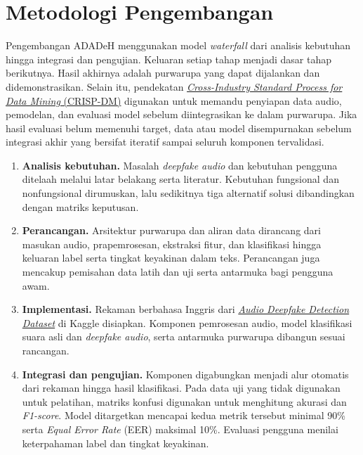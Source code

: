 \section{Metodologi Pengembangan}
Pengembangan ADADeH menggunakan model \textit{waterfall} dari analisis kebutuhan hingga integrasi dan pengujian. Keluaran setiap tahap menjadi dasar tahap berikutnya. Hasil akhirnya adalah purwarupa yang dapat dijalankan dan didemonstrasikan. Selain itu, pendekatan \href{https://public.dhe.ibm.com/software/analytics/spss/documentation/modeler/14.2/es/CRISP-DM.pdf}{\textit{Cross-Industry Standard Process for Data Mining} (CRISP-DM)} digunakan untuk memandu penyiapan data audio, pemodelan, dan evaluasi model sebelum diintegrasikan ke dalam purwarupa. Jika hasil evaluasi belum memenuhi target, data atau model disempurnakan sebelum integrasi akhir yang bersifat iteratif sampai seluruh komponen tervalidasi.

\begin{enumerate}
\item \textbf{Analisis kebutuhan.} Masalah \textit{deepfake audio} dan kebutuhan pengguna ditelaah melalui latar belakang serta literatur. Kebutuhan fungsional dan nonfungsional dirumuskan, lalu sedikitnya tiga alternatif solusi dibandingkan dengan matriks keputusan.
\item \textbf{Perancangan.} Arsitektur purwarupa dan aliran data dirancang dari masukan audio, prapemrosesan, ekstraksi fitur, dan klasifikasi hingga keluaran label serta tingkat keyakinan dalam teks. Perancangan juga mencakup pemisahan data latih dan uji serta antarmuka bagi pengguna awam.
\item \textbf{Implementasi.} Rekaman berbahasa Inggris dari \href{https://www.kaggle.com/datasets/adarshsingh0903/audio-deepfake-detection-dataset}{\textit{Audio Deepfake Detection Dataset}} di Kaggle disiapkan. Komponen pemrosesan audio, model klasifikasi suara asli dan \textit{deepfake audio}, serta antarmuka purwarupa dibangun sesuai rancangan.
\item \textbf{Integrasi dan pengujian.} Komponen digabungkan menjadi alur otomatis dari rekaman hingga hasil klasifikasi. Pada data uji yang tidak digunakan untuk pelatihan, matriks konfusi digunakan untuk menghitung akurasi dan \textit{F1-score}. Model ditargetkan mencapai kedua metrik tersebut minimal 90\% serta \textit{Equal Error Rate} (EER) maksimal 10\%. Evaluasi pengguna menilai keterpahaman label dan tingkat keyakinan.
\end{enumerate}

